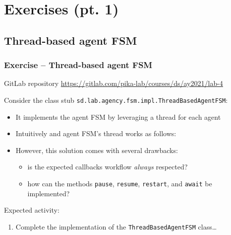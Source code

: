 \documentclass[presentation]{beamer}\mode<presentation>{\usetheme{AMSCesenaPurpleAndGold}}
\newcommand{\labN}{4}
\newcommand{\labGroup}{https://gitlab.com/pika-lab/courses/ds/ay2021}
\newcommand{\labRepo}{\labGroup/lab-\labN}
\begin{document}
\section{Exercises (pt. 1)}

\startExercise

\subsection{Thread-based agent FSM}

\begin{frame}[c, allowframebreaks]
    \frametitle{Exercise \currentExercise{} -- Thread-based agent FSM}

    \begin{block}{GitLab repository}\centering
        \url{\labRepo}
    \end{block}

    \bigskip

    Consider the class stub \texttt{sd.lab.agency.fsm.impl.\alert{ThreadBasedAgentFSM}}:
    \bigskip
    \begin{itemize}
        \item It implements the agent FSM by leveraging a thread for each agent

        \framebreak

        \item Intuitively and agent FSM's thread works as follows:
        

        \item However, this solution comes with several drawbacks:
        \begin{itemize}
            \item is the expected callbacks workflow \emph{always} respected?
            \item how can the methods \texttt{pause}, \texttt{resume}, \texttt{restart}, and \texttt{await} be implemented?
        \end{itemize}

    \end{itemize}

    \framebreak

    Expected activity:
    \bigskip
    \begin{enumerate}

        \item Complete the implementation of the \texttt{ThreadBasedAgentFSM} class\ldots


\end{enumerate}
\end{frame}
\end{document}
